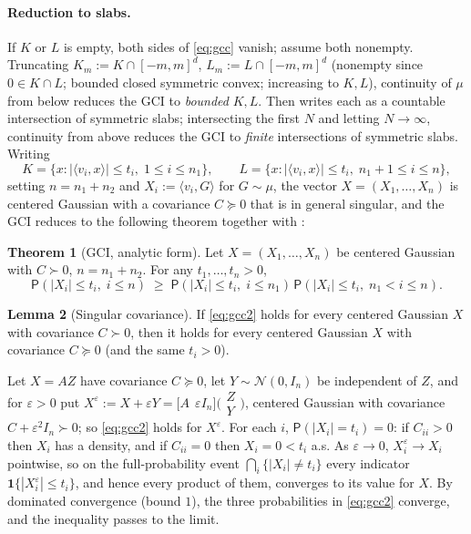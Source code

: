 \documentclass[14pt]{extarticle}
\makeatletter
\theoremstyle{definition}
\newtheorem{theorem}{Theorem}[section]
\newtheorem{lemma}[theorem]{Lemma}
\renewenvironment{proof}[1][\proofname]{\par
  \pushQED{\qed}%
  \normalfont \topsep6\p@\@plus6\p@\relax
  \trivlist
  \item[\hskip\labelsep\bfseries #1\@addpunct{.}]\ignorespaces
}{%
  \popQED\endtrivlist\@endpefalse
}
\newcommand{\PP}{\mathsf{P}}
\newcommand{\caln}{\mathcal{N}}
\makeatother
\begin{document}
\paragraph{Reduction to slabs.}  If $K$ or $L$ is empty, both sides of
\eqref{eq:gcc} vanish; assume both nonempty.  Truncating
$K_m:=K\cap[-m,m]^d$, $L_m:=L\cap[-m,m]^d$ (nonempty since
$0\in K\cap L$; bounded closed symmetric convex; increasing to $K,L$),
continuity of $\mu$ from below reduces the GCI to \emph{bounded} $K,L$.
Then  writes each as a countable intersection of
symmetric slabs; intersecting the first $N$ and letting $N\to\infty$,
continuity from above reduces the GCI to \emph{finite} intersections of
symmetric slabs.  Writing
\[
  K=\bigl\{x : |\langle v_i,x\rangle|\leqslant t_i,\;1\leqslant i\leqslant n_1\bigr\},
  \qquad
  L=\bigl\{x : |\langle v_i,x\rangle|\leqslant t_i,\;n_1{+}1\leqslant i\leqslant n\bigr\},
\]
setting $n=n_1+n_2$ and $X_i:=\langle v_i,G\rangle$ for $G\sim\mu$,
the vector $X=(X_1,\ldots,X_n)$ is centered Gaussian with a covariance
$C\succcurlyeq 0$ that is in general singular, and the GCI reduces to
the following theorem together with :

\begin{theorem}[GCI, analytic form]\label{thm:gcc2}
  Let $X=(X_1,\ldots,X_n)$ be centered Gaussian with $C\succ 0$,
  $n=n_1+n_2$.  For any $t_1,\ldots,t_n>0$,
  \begin{equation}\label{eq:gcc2}
    \PP(|X_i|\leqslant t_i,\;i\leqslant n)
    \;\geqslant\;
    \PP(|X_i|\leqslant t_i,\;i\leqslant n_1)\,
    \PP(|X_i|\leqslant t_i,\;n_1{<}i\leqslant n).
  \end{equation}
\end{theorem}

\begin{lemma}[Singular covariance]\label{lem:singular}
  If \eqref{eq:gcc2} holds for every centered Gaussian $X$ with
  covariance $C\succ 0$, then it holds for every centered Gaussian $X$
  with covariance $C\succcurlyeq 0$ (and the same $t_i>0$).
\end{lemma}

\begin{proof}
  Let $X=AZ$ have covariance $C\succcurlyeq 0$, let
  $Y\sim\caln(0,I_n)$ be independent of $Z$, and for $\varepsilon>0$
  put $X^\varepsilon:=X+\varepsilon Y=\bigl[A\ \ \varepsilon I_n\bigr]
  \bigl(\begin{smallmatrix}Z\\ Y\end{smallmatrix}\bigr)$, centered
  Gaussian with covariance $C+\varepsilon^2I_n\succ 0$; so
  \eqref{eq:gcc2} holds for $X^\varepsilon$.  For each $i$,
  $\PP(|X_i|=t_i)=0$: if $C_{ii}>0$ then $X_i$ has a density, and if
  $C_{ii}=0$ then $X_i=0<t_i$ a.s.  As $\varepsilon\to 0$,
  $X^\varepsilon_i\to X_i$ pointwise, so on the full-probability event
  $\bigcap_i\{|X_i|\neq t_i\}$ every indicator
  $\mathbf 1\{|X^\varepsilon_i|\leqslant t_i\}$, and hence every product
  of them, converges to its value for $X$.  By dominated convergence
  (bound $1$), the three probabilities in \eqref{eq:gcc2} converge, and
  the inequality passes to the limit.
\end{proof}
\end{document}
